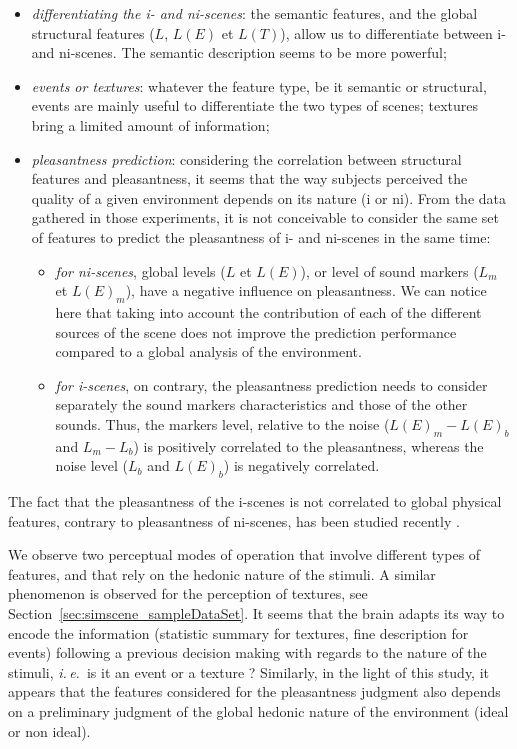 \documentclass[preprint,12pt]{elsarticle}
\newcommand{\ie}{\emph{i.\,e.}}
\begin{document}
\begin{itemize}
\item \emph{differentiating the i- and ni-scenes}: the semantic features, and the global structural features ($L$, $L(E)$ et $L(T)$), allow us to differentiate between i- and ni-scenes. The semantic description seems to be more powerful;
\item \emph{events or textures}: whatever the feature type, be it semantic or structural, events are mainly useful to differentiate the two types of scenes; textures bring a limited amount of information;
\item \emph{pleasantness prediction}: considering the correlation between structural features and pleasantness, it seems that the way subjects perceived the quality of a given environment depends on its nature (i or ni). From the data gathered in those experiments, it is not conceivable to consider the same set of features to predict the pleasantness of i- and ni-scenes in the same time:

\begin{itemize}

\item \emph{for ni-scenes}, global levels ($L$ et $L(E)$), or level of sound markers ($L_m$ et $L(E)_{m}$), have a negative influence on pleasantness. We can notice here that taking into account the contribution of each of the different sources of the scene does not improve the prediction performance compared to a global analysis of the environment.

\item \emph{for i-scenes}, on contrary, the pleasantness prediction needs to consider separately the sound markers characteristics and those of the other sounds. Thus, the markers level, relative to the noise ($L(E)_m-L(E)_b$ and $L_m-L_b$) is positively correlated to the pleasantness, whereas the noise level ($L_b$ and $L(E)_b$) is negatively correlated.
\end{itemize}
\end{itemize}

The fact that the pleasantness of the i-scenes is not correlated to global physical features, contrary to pleasantness of ni-scenes, has been studied recently \cite{gozalo2015relationship}.

We observe two perceptual modes of operation that involve different types of features, and that rely on the hedonic nature  of the stimuli. A similar phenomenon is observed for the perception of textures, see Section~\ref{sec:simscene_sampleDataSet}. It seems that the brain adapts its way to encode the information (statistic summary for textures, fine description for events) following a previous decision making with regards to the nature of the stimuli, \ie~is it an event or a texture ? Similarly, in the light of this study, it appears that the features considered for the pleasantness judgment also depends on a preliminary judgment of the global hedonic nature of the environment (ideal or non ideal).
\end{document}
